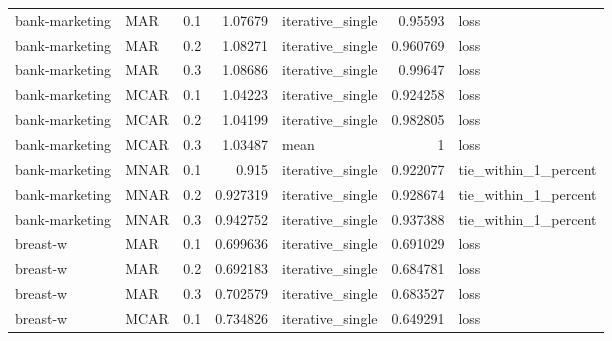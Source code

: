 \begin{table}[ht]
{\begin{tabular}{llrrlrl}
 bank-marketing       & MAR         &         0.1 &                          1.07679  & iterative\_single &                           0.95593  & loss                 \\
 bank-marketing       & MAR         &         0.2 &                          1.08271  & iterative\_single &                           0.960769 & loss                 \\
 bank-marketing       & MAR         &         0.3 &                          1.08686  & iterative\_single &                           0.99647  & loss                 \\
 bank-marketing       & MCAR        &         0.1 &                          1.04223  & iterative\_single &                           0.924258 & loss                 \\
 bank-marketing       & MCAR        &         0.2 &                          1.04199  & iterative\_single &                           0.982805 & loss                 \\
 bank-marketing       & MCAR        &         0.3 &                          1.03487  & mean             &                           1        & loss                 \\
 bank-marketing       & MNAR        &         0.1 &                          0.915    & iterative\_single &                           0.922077 & tie\_within\_1\_percent \\
 bank-marketing       & MNAR        &         0.2 &                          0.927319 & iterative\_single &                           0.928674 & tie\_within\_1\_percent \\
 bank-marketing       & MNAR        &         0.3 &                          0.942752 & iterative\_single &                           0.937388 & tie\_within\_1\_percent \\
 breast-w             & MAR         &         0.1 &                          0.699636 & iterative\_single &                           0.691029 & loss                 \\
 breast-w             & MAR         &         0.2 &                          0.692183 & iterative\_single &                           0.684781 & loss                 \\
 breast-w             & MAR         &         0.3 &                          0.702579 & iterative\_single &                           0.683527 & loss                 \\
 breast-w             & MCAR        &         0.1 &                          0.734826 & iterative\_single &                           0.649291 & loss                 \\

\end{tabular}}
\end{table}
